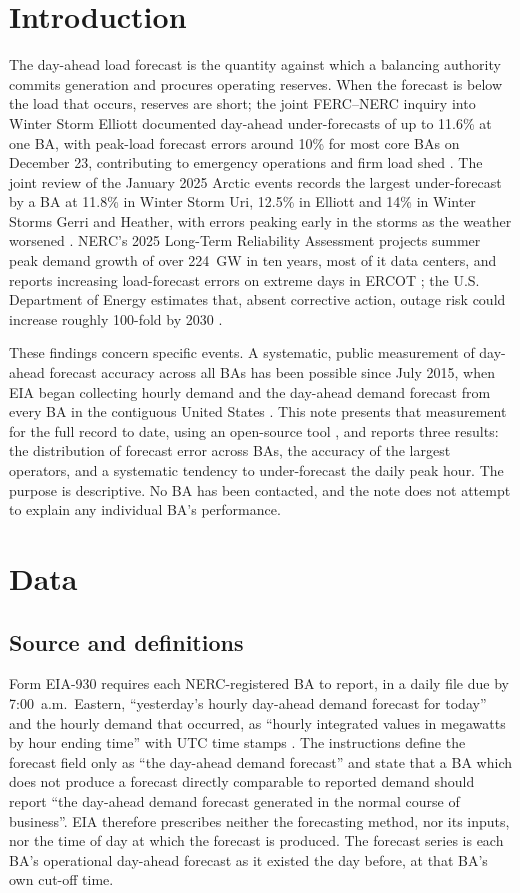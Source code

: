 \documentclass[conference]{IEEEtran}
\begin{document}
\section{Introduction}
The day-ahead load forecast is the quantity against which a balancing authority commits generation and procures operating reserves. When the forecast is below the load that occurs, reserves are short; the joint FERC--NERC inquiry into Winter Storm Elliott documented day-ahead under-forecasts of up to 11.6\% at one BA, with peak-load forecast errors around 10\% for most core BAs on December 23, contributing to emergency operations and firm load shed \cite{ferc2023elliott}. The joint review of the January 2025 Arctic events records the largest under-forecast by a BA at 11.8\% in Winter Storm Uri, 12.5\% in Elliott and 14\% in Winter Storms Gerri and Heather, with errors peaking early in the storms as the weather worsened \cite{ferc2025arctic}. NERC's 2025 Long-Term Reliability Assessment projects summer peak demand growth of over 224~GW in ten years, most of it data centers, and reports increasing load-forecast errors on extreme days in ERCOT \cite{nerc2026ltra}; the U.S. Department of Energy estimates that, absent corrective action, outage risk could increase roughly 100-fold by 2030 \cite{doe2025reliability}.

These findings concern specific events. A systematic, public measurement of day-ahead forecast accuracy across all BAs has been possible since July 2015, when EIA began collecting hourly demand and the day-ahead demand forecast from every BA in the contiguous United States \cite{eia930monitor}. This note presents that measurement for the full record to date, using an open-source tool \cite{guerra2026scorecard}, and reports three results: the distribution of forecast error across BAs, the accuracy of the largest operators, and a systematic tendency to under-forecast the daily peak hour. The purpose is descriptive. No BA has been contacted, and the note does not attempt to explain any individual BA's performance.

\section{Data}
\subsection{Source and definitions}
Form EIA-930 requires each NERC-registered BA to report, in a daily file due by 7:00~a.m.\ Eastern, ``yesterday's hourly day-ahead demand forecast for today'' and the hourly demand that occurred, as ``hourly integrated values in megawatts by hour ending time'' with UTC time stamps \cite{eia930instructions}. The instructions define the forecast field only as ``the day-ahead demand forecast'' and state that a BA which does not produce a forecast directly comparable to reported demand should report ``the day-ahead demand forecast generated in the normal course of business''. EIA therefore prescribes neither the forecasting method, nor its inputs, nor the time of day at which the forecast is produced. The forecast series is each BA's operational day-ahead forecast as it existed the day before, at that BA's own cut-off time.
\end{document}
